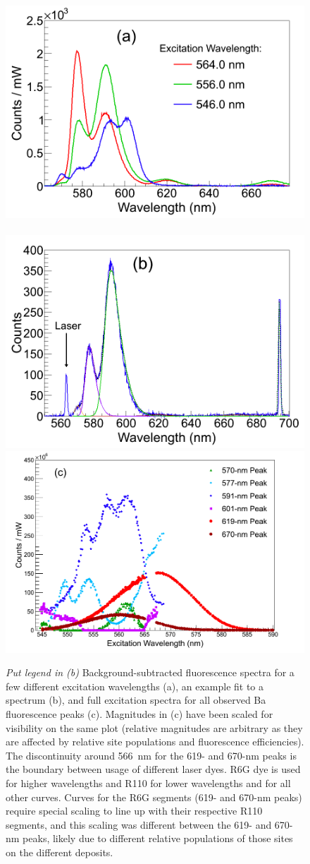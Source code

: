 \begin{figure} %
        \centering
                \includegraphics[width=.5\textwidth]{figures/excitspec_grn_spectra_v2.png}
                ~
                \includegraphics[width=.5\textwidth]{figures/excitspec_grn_spectra_fit.png}
                \includegraphics[width=.95\textwidth]{figures/excitspec_grn.png}
                \caption{\emph{\color{red}Put legend in (b)	}Background-subtracted fluorescence spectra for a few different excitation wavelengths (a), an example fit to a spectrum (b), and full excitation spectra for all observed Ba fluorescence peaks (c).  Magnitudes in (c) have been scaled for visibility on the same plot (relative magnitudes are arbitrary as they are affected by relative site populations and fluorescence efficiencies).  The discontinuity around 566~nm for the 619- and 670-nm peaks is the boundary between usage of different laser dyes.  R6G dye is used for higher wavelengths and R110 for lower wavelengths and for all other curves.  Curves for the R6G segments (619- and 670-nm peaks) require special scaling to line up with their respective R110 segments, and this scaling was different between the 619- and 670-nm peaks, likely due to different relative populations of those sites on the different deposits.}
\label{fig:excitspecGrn}
\end{figure}

